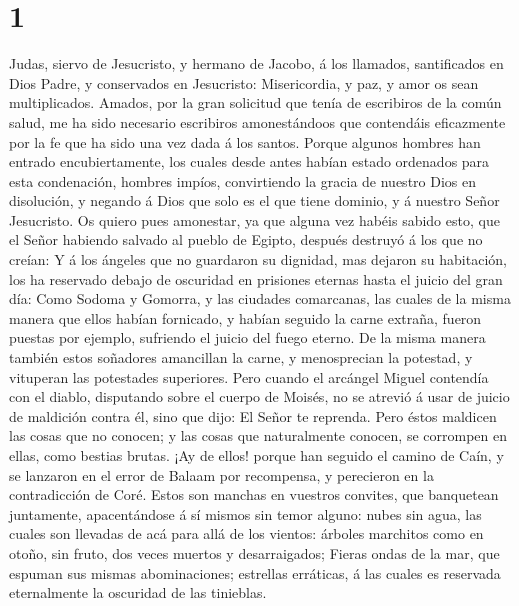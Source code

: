 \hypertarget{section}{%
\section{1}\label{section}}

 Judas, siervo de Jesucristo, y hermano de Jacobo, á los
llamados, santificados en Dios Padre, y conservados en Jesucristo:
 Misericordia, y paz, y amor os sean multiplicados.
 Amados, por la gran solicitud que tenía de escribiros de la
común salud, me ha sido necesario escribiros amonestándoos que
contendáis eficazmente por la fe que ha sido una vez dada á los santos.
 Porque algunos hombres han entrado encubiertamente, los
cuales desde antes habían estado ordenados para esta condenación,
hombres impíos, convirtiendo la gracia de nuestro Dios en disolución, y
negando á Dios que solo es el que tiene dominio, y á nuestro Señor
Jesucristo.  Os quiero pues amonestar, ya que alguna vez
habéis sabido esto, que el Señor habiendo salvado al pueblo de Egipto,
después destruyó á los que no creían:  Y á los ángeles que
no guardaron su dignidad, mas dejaron su habitación, los ha reservado
debajo de oscuridad en prisiones eternas hasta el juicio del gran día:
 Como Sodoma y Gomorra, y las ciudades comarcanas, las
cuales de la misma manera que ellos habían fornicado, y habían seguido
la carne extraña, fueron puestas por ejemplo, sufriendo el juicio del
fuego eterno.  De la misma manera también estos soñadores
amancillan la carne, y menosprecian la potestad, y vituperan las
potestades superiores.  Pero cuando el arcángel Miguel
contendía con el diablo, disputando sobre el cuerpo de Moisés, no se
atrevió á usar de juicio de maldición contra él, sino que dijo: El Señor
te reprenda.  Pero éstos maldicen las cosas que no conocen;
y las cosas que naturalmente conocen, se corrompen en ellas, como
bestias brutas.  ¡Ay de ellos! porque han seguido el camino
de Caín, y se lanzaron en el error de Balaam por recompensa, y
perecieron en la contradicción de Coré.  Estos son manchas
en vuestros convites, que banquetean juntamente, apacentándose á sí
mismos sin temor alguno: nubes sin agua, las cuales son llevadas de acá
para allá de los vientos: árboles marchitos como en otoño, sin fruto,
dos veces muertos y desarraigados;  Fieras ondas de la mar,
que espuman sus mismas abominaciones; estrellas erráticas, á las cuales
es reservada eternalmente la oscuridad de las tinieblas. 
